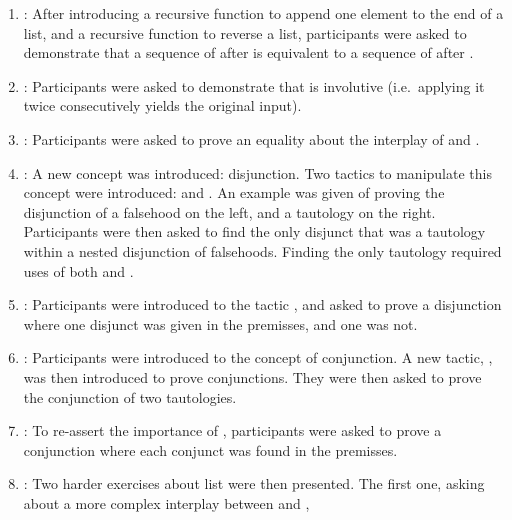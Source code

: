 \begin{enumerate}

  \item {}: After introducing a recursive function
 to append one element to the end of a list, and a recursive
function  to reverse a list, participants were asked to
demonstrate that a sequence of  after  is
equivalent to a sequence of  after .

  \item {}: Participants were asked to demonstrate that
 is involutive (i.e.\ applying it twice consecutively yields the
original input).

  \item {}: Participants were asked to prove an
equality about the interplay of  and .

  \item {}: A new concept was introduced: disjunction.
Two tactics to manipulate this concept were introduced:  and
.  An example was given of proving the disjunction of a
falsehood on the left, and a tautology on the right.  Participants were then
asked to find the only disjunct that was a tautology within a nested disjunction
of falsehoods.  Finding the only tautology required uses of both
 and .

  \item {}: Participants were introduced to the tactic
, and asked to prove a disjunction where one disjunct was given
in the premisses, and one was not.

  \item {}: Participants were introduced to the concept of
conjunction.  A new tactic, , was then introduced to prove
conjunctions.  They were then asked to prove the conjunction of two tautologies.

  \item {}: To re-assert the importance of ,
participants were asked to prove a conjunction where each conjunct was found in
the premisses.

  \item {}: Two harder exercises about list were then
presented.  The first one, asking about a more complex interplay between
 and ,


\end{enumerate}
